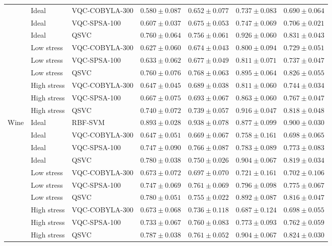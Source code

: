 \documentclass[12pt,a4paper]{article}
\begin{document}
{{\begin{longtable}{lllllll}
 & Ideal & VQC-COBYLA-300 & $0.580\pm0.087$ & $0.652\pm0.077$ & $0.737\pm0.083$ & $0.690\pm0.064$ \\
 & Ideal & VQC-SPSA-100 & $0.607\pm0.037$ & $0.675\pm0.053$ & $0.747\pm0.069$ & $0.706\pm0.021$ \\
 & Ideal & QSVC & $0.760\pm0.064$ & $0.756\pm0.061$ & $0.926\pm0.060$ & $0.831\pm0.043$ \\
 & Low stress & VQC-COBYLA-300 & $0.627\pm0.060$ & $0.674\pm0.043$ & $0.800\pm0.094$ & $0.729\pm0.051$ \\
 & Low stress & VQC-SPSA-100 & $0.633\pm0.062$ & $0.677\pm0.049$ & $0.811\pm0.071$ & $0.737\pm0.047$ \\
 & Low stress & QSVC & $0.760\pm0.076$ & $0.768\pm0.063$ & $0.895\pm0.064$ & $0.826\pm0.055$ \\
 & High stress & VQC-COBYLA-300 & $0.647\pm0.045$ & $0.689\pm0.038$ & $0.811\pm0.060$ & $0.744\pm0.034$ \\
 & High stress & VQC-SPSA-100 & $0.667\pm0.075$ & $0.693\pm0.067$ & $0.863\pm0.060$ & $0.767\pm0.047$ \\
 & High stress & QSVC & $0.740\pm0.072$ & $0.739\pm0.057$ & $0.916\pm0.047$ & $0.818\pm0.048$ \\
\midrule
Wine & Ideal & RBF-SVM & $0.893\pm0.028$ & $0.938\pm0.078$ & $0.877\pm0.099$ & $0.900\pm0.030$ \\
 & Ideal & VQC-COBYLA-300 & $0.647\pm0.051$ & $0.669\pm0.067$ & $0.758\pm0.161$ & $0.698\pm0.065$ \\
 & Ideal & VQC-SPSA-100 & $0.747\pm0.090$ & $0.766\pm0.087$ & $0.783\pm0.089$ & $0.773\pm0.083$ \\
 & Ideal & QSVC & $0.780\pm0.038$ & $0.750\pm0.026$ & $0.904\pm0.067$ & $0.819\pm0.034$ \\
 & Low stress & VQC-COBYLA-300 & $0.673\pm0.072$ & $0.697\pm0.070$ & $0.721\pm0.161$ & $0.702\pm0.106$ \\
 & Low stress & VQC-SPSA-100 & $0.747\pm0.069$ & $0.761\pm0.069$ & $0.796\pm0.098$ & $0.775\pm0.067$ \\
 & Low stress & QSVC & $0.780\pm0.051$ & $0.755\pm0.022$ & $0.892\pm0.087$ & $0.816\pm0.047$ \\
 & High stress & VQC-COBYLA-300 & $0.673\pm0.068$ & $0.736\pm0.118$ & $0.687\pm0.124$ & $0.698\pm0.055$ \\
 & High stress & VQC-SPSA-100 & $0.733\pm0.067$ & $0.760\pm0.083$ & $0.773\pm0.093$ & $0.762\pm0.059$ \\
 & High stress & QSVC & $0.787\pm0.038$ & $0.761\pm0.052$ & $0.904\pm0.067$ & $0.824\pm0.030$ \\
\end{longtable}
}
}
\end{document}
